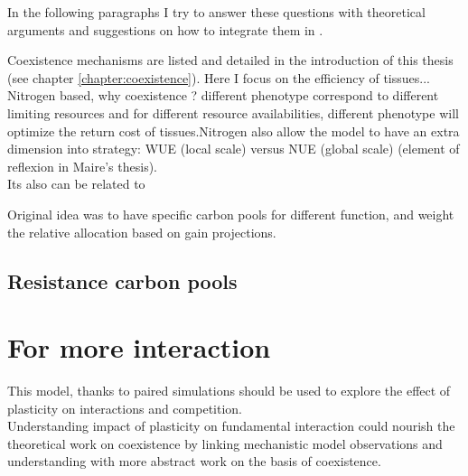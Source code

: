 In the following paragraphs I try to answer these questions with theoretical arguments and suggestions on how to integrate them in \model.


Coexistence mechanisms are listed and detailed in the introduction of this thesis (see chapter \ref{chapter:coexistence}). Here I focus on the efficiency of tissues... Nitrogen based, why coexistence ? different phenotype correspond to different limiting resources and for different resource availabilities, different phenotype will optimize the return cost of tissues.Nitrogen also allow the model to have an extra dimension into strategy: WUE (local scale) versus NUE (global scale) (element of reflexion in Maire's thesis).\\
Its also can be related to



Original idea was to have specific carbon pools for different function, and weight the relative allocation based on gain projections.\\

\subsection{Resistance carbon pools}

\section{For more interaction}

This model, thanks to paired simulations should be used to explore the effect of plasticity on interactions and competition.\\
Understanding impact of plasticity on fundamental interaction could nourish the theoretical work on coexistence by linking mechanistic model observations and understanding with more abstract work on the basis of coexistence.

